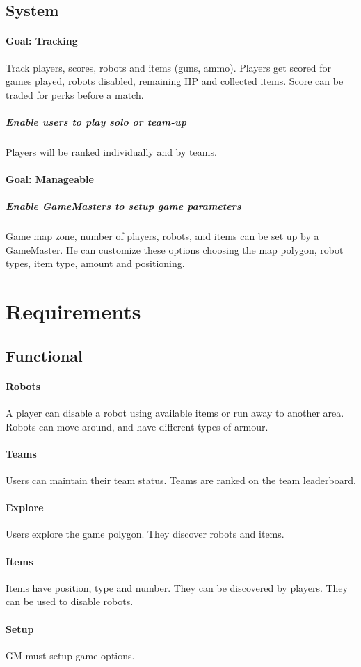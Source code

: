 \documentclass{article}
\begin{document}
\subsection{System}
\paragraph{\textbf{Goal}: Tracking}
Track players, scores, robots and items (guns, ammo). Players get scored for games played, robots disabled, remaining HP and collected items. Score can be traded for perks before a match. 
\subparagraph{Enable users to play solo or team-up}
Players will be ranked individually and by teams.
\paragraph{\textbf{Goal}: Manageable}
\subparagraph{Enable GameMasters to setup game parameters}
Game map zone, number of players, robots, and items can be set up by a GameMaster. He can customize these options choosing the map polygon, robot types, item type, amount and positioning.
\section{Requirements}
\subsection{Functional}
\paragraph{Robots}
A player can disable a robot using available items or run away to another area. Robots can move around, and have different types of armour.
\paragraph{Teams}
Users can maintain their team status. Teams are ranked on the team leaderboard.
\paragraph{Explore}
Users explore the game polygon. They discover robots and items.
\paragraph{Items}
Items have position, type and number. They can be discovered by players. They can be used to disable robots.
\paragraph{Setup}
GM must setup game options.
\end{document}

